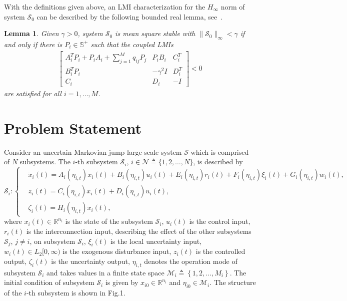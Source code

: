 \documentclass[11pt,draftcls,onecolumn]{IEEEtran}
\newtheorem{lemma}{Lemma}
\begin{document}
With the definitions given above, an LMI characterization for the $H_{\infty}$ norm of system $\mathcal{S}_0$ can be described by the following bounded real lemma, see~\cite{Zhang2008, Marcos2008}.
\begin{lemma}
 Given $\gamma>0$, system $\mathcal{S}_0$ is mean square stable with $\|\mathcal{S}_0\|_{\infty}<\gamma$ if and only if there is $P_i \in \mathbb{S}^{+}$ such that the coupled LMIs
\begin{align*}
\begin{bmatrix}
A_i^TP_i+P_iA_i+\sum_{j=1}^M q_{ij}P_j & P_i B_i & C_i^T\\
B_i^T P_i & -\gamma^2 I & D_i^T \\
C_i & D_i & -I
\end{bmatrix}<0
\end{align*}
are satisfied for all $i=1,\ldots, M$.
\end{lemma}


\section{Problem Statement}

Consider  an uncertain Markovian jump large-scale system
$\mathcal{S}$  which is comprised of $N$ subsystems. The $i$-th subsystem $\mathcal{S}_i$, $i \in \mathcal{N}\triangleq\{1,2,\ldots,N\} $, is described by
\begin{equation*}
\label{local mode system}
 \mathcal{S}_i:\left\{
 \begin{aligned}
 &\dot x_i(t) =A_i(\eta_{i,t})x_i(t)+B_i(\eta_{i,t})u_i(t) +E_i(\eta_{i,t})r_i(t)+F_i(\eta_{i,t})\xi_i(t)+G_i(\eta_{i,t})w_i(t),\\
&z_i(t) =C_i(\eta_{i,t})x_i(t)+D_i(\eta_{i,t})u_i(t),\\
&\zeta_i(t)=H_i(\eta_{i,t})x_i(t),
 \end{aligned} \right.
\end{equation*}
where $x_i(t)\in \mathbb{R}^{n_i} $ is the state of the subsystem $ \mathcal{S}_i$, $ u_i(t)$ is the control input,
$r_i(t)$ is the interconnection input, describing the effect of the other subsystems $ \mathcal{S}_j$, $j\neq i$, on subsystem  $ \mathcal{S}_i $, $\xi_i(t)$ is the local uncertainty input, $w_i(t) \in L_2[0,\infty) $ is the  exogenous disturbance input,  $z_i(t)$ is the controlled output,
 $\zeta_i(t)$ is the uncertainty output,  $ \eta_{i,t} $  denotes the operation mode of subsystem $ \mathcal{S}_i $  and  takes values in a finite state space $ \mathcal{M}_i\triangleq\left\{1,2,\ldots,M_i\right\}$. The initial condition of subsystem $\mathcal{S}_i$ is given by $x_{i0}\in \mathbb{R}^{n_i}$ and $\eta_{i0} \in \mathcal{M}_i $. The structure of the $i$-th subsystem is shown in Fig.1.
\end{document}
